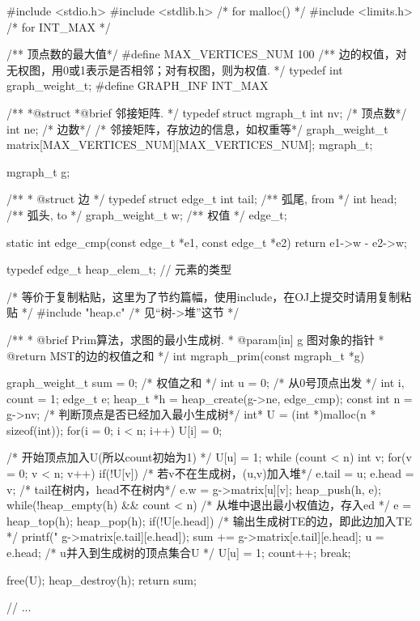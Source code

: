 \begin{Codex}[label=mgraph_prim2.c]
#include <stdio.h>
#include <stdlib.h>  /* for malloc() */
#include <limits.h>  /* for INT_MAX */

/** 顶点数的最大值*/
#define MAX_VERTICES_NUM 100
/** 边的权值，对无权图，用0或1表示是否相邻；对有权图，则为权值. */
typedef int graph_weight_t;
#define GRAPH_INF INT_MAX

/**
 *@struct
 *@brief 邻接矩阵.
 */
typedef struct mgraph_t {
    int nv; /* 顶点数*/
    int ne; /* 边数*/
    /* 邻接矩阵，存放边的信息，如权重等*/
    graph_weight_t matrix[MAX_VERTICES_NUM][MAX_VERTICES_NUM];
} mgraph_t;

mgraph_t g;


/**
 * @struct 边
 */
typedef struct edge_t{
    int tail;  /** 弧尾, from */
    int head;  /** 弧头, to */
    graph_weight_t w;  /** 权值 */
}edge_t;

static int edge_cmp(const edge_t *e1, const edge_t *e2) {
    return e1->w - e2->w;
}

typedef edge_t heap_elem_t; // 元素的类型

/* 等价于复制粘贴，这里为了节约篇幅，使用include，在OJ上提交时请用复制粘贴 */
#include "heap.c"  /* 见“树->堆”这节 */

/**
  * @brief Prim算法，求图的最小生成树.
  * @param[in] g 图对象的指针
  * @return MST的边的权值之和
  */
int mgraph_prim(const mgraph_t *g){
    graph_weight_t sum = 0; /* 权值之和 */
    int u = 0; /* 从0号顶点出发 */
    int i, count = 1;
    edge_t e;
    heap_t *h = heap_create(g->ne, edge_cmp);
    const int n = g->nv;
    /* 判断顶点是否已经加入最小生成树*/
    int* U = (int *)malloc(n * sizeof(int));
    for(i = 0; i < n; i++) U[i] = 0;

    /* 开始顶点加入U(所以count初始为1) */
    U[u] = 1;
    while (count < n) {
        int v;
        for(v = 0; v < n; v++) if(!U[v]) { /* 若v不在生成树，(u,v)加入堆*/
            e.tail = u;
            e.head = v;
            /* tail在树内，head不在树内*/
            e.w = g->matrix[u][v];
            heap_push(h, e);
        }
        while(!heap_empty(h) && count < n) {
            /* 从堆中退出最小权值边，存入ed */
            e = heap_top(h); heap_pop(h);
            if(!U[e.head]) {
                /* 输出生成树TE的边，即此边加入TE */
                printf("%
                        g->matrix[e.tail][e.head]);
                sum += g->matrix[e.tail][e.head];
                u = e.head;
                /* u并入到生成树的顶点集合U */
                U[u] = 1;
                count++;
                break;
            }
        }
    }

    free(U);
    heap_destroy(h);
    return sum;
}

// ...
\end{Codex}

